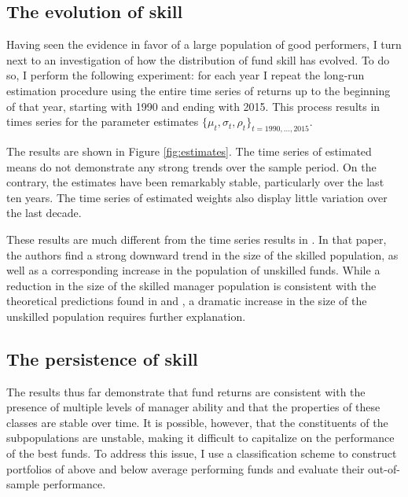 \subsection{The evolution of skill}
Having seen the evidence in favor of a large population of good performers, I turn next to an investigation of how the distribution of fund skill has evolved. To do so, I perform the following experiment: for each year I repeat the long-run estimation procedure using the entire time series of returns up to the beginning of that year, starting with 1990 and ending with 2015. This process results in times series for the parameter estimates $\{\mu_t, \sigma_t, \rho_t\}_{t=1990,\dots,2015}$.

The results are shown in Figure \ref{fig:estimates}. The time series of estimated means do not demonstrate any strong trends over the sample period. On the contrary, the estimates have been remarkably stable, particularly over the last ten years. The time series of estimated weights also display little variation over the last decade.

These results are much different from the time series results in \citet{Barras2010}.  In that paper, the authors find a strong downward trend in the size of the skilled population, as well as a corresponding increase in the population of unskilled funds.  While a reduction in the size of the skilled manager population is consistent with the theoretical predictions found in \citet{Berk2004} and \citet{Pastor2012}, a dramatic increase in the size of the unskilled population requires further explanation.

\subsection{The persistence of skill}
The results thus far demonstrate that fund returns are consistent with the presence of multiple levels of manager ability and that the properties of these classes are stable over time. It is possible, however, that the constituents of the subpopulations are unstable, making it difficult to capitalize on the performance of the best funds. To address this issue, I use a classification scheme to construct portfolios of above and below average performing funds and evaluate their out-of-sample performance.


